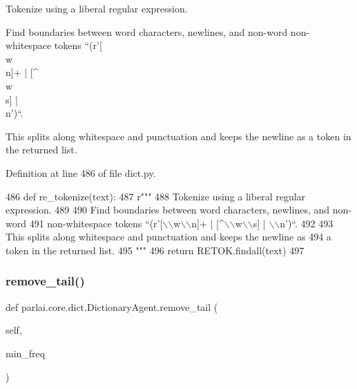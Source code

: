 \begin{DoxyVerb}Tokenize using a liberal regular expression.

Find boundaries between word characters, newlines, and non-word
non-whitespace tokens ``(r'[\\w\\n]+ | [^\\w\\s] | \\n')``.

This splits along whitespace and punctuation and keeps the newline as
a token in the returned list.
\end{DoxyVerb}
 

Definition at line 486 of file dict.\+py.


\begin{DoxyCode}
486     \textcolor{keyword}{def }re\_tokenize(text):
487         \textcolor{stringliteral}{r"""}
488 \textcolor{stringliteral}{        Tokenize using a liberal regular expression.}
489 \textcolor{stringliteral}{}
490 \textcolor{stringliteral}{        Find boundaries between word characters, newlines, and non-word}
491 \textcolor{stringliteral}{        non-whitespace tokens ``(r'[\(\backslash\)\(\backslash\)w\(\backslash\)\(\backslash\)n]+ | [^\(\backslash\)\(\backslash\)w\(\backslash\)\(\backslash\)s] | \(\backslash\)\(\backslash\)n')``.}
492 \textcolor{stringliteral}{}
493 \textcolor{stringliteral}{        This splits along whitespace and punctuation and keeps the newline as}
494 \textcolor{stringliteral}{        a token in the returned list.}
495 \textcolor{stringliteral}{        """}
496         \textcolor{keywordflow}{return} RETOK.findall(text)
497 
\end{DoxyCode}
\mbox{\label{classparlai_1_1core_1_1dict_1_1DictionaryAgent_ae828063449b45112d82a97921d35c247}} 
\subsubsection{\texorpdfstring{remove\+\_\+tail()}{remove\_tail()}}
{\footnotesize\ttfamily def parlai.\+core.\+dict.\+Dictionary\+Agent.\+remove\+\_\+tail (\begin{DoxyParamCaption}\item[{}]{self,  }\item[{}]{min\+\_\+freq }\end{DoxyParamCaption})}

